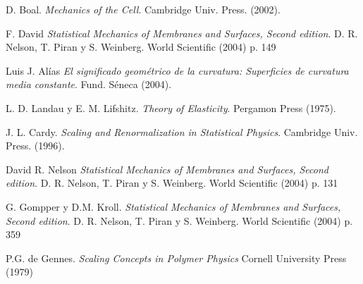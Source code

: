 \begin{thebibliography}{99}









  D. Boal. 
  \textit{Mechanics of the Cell}.  
  Cambridge Univ. Press. (2002).

F. David
  \textit{Statistical Mechanics of Membranes and Surfaces, Second edition}.
  D. R. Nelson, T. Piran y S. Weinberg.
  World Scientific (2004) p. 149


Luis J. Alías
  \textit{El significado geométrico de la curvatura: Superficies de curvatura
    media constante}.
  Fund. Séneca (2004).

L. D. Landau y E. M. Lifshitz.
  \textit{Theory of Elasticity}.
  Pergamon Press (1975).

 J. L. Cardy.
  \textit{Scaling and Renormalization in Statistical Physics}.
  Cambridge Univ. Press. (1996).

 David R. Nelson
  \textit{Statistical Mechanics of Membranes and Surfaces, Second edition}.
  D. R. Nelson, T. Piran y S. Weinberg.
  World Scientific (2004) p. 131

G. Gompper y D.M. Kroll.
  \textit{Statistical Mechanics of Membranes and Surfaces, Second edition}.
  D. R. Nelson, T. Piran y S. Weinberg.
  World Scientific (2004) p. 359

 P.G. de Gennes.
   \textit{Scaling Concepts in Polymer Physics}
   Cornell University Press (1979)



\end{thebibliography}
